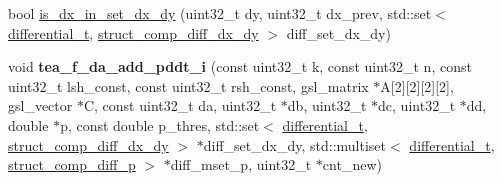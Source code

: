 \begin{DoxyCompactItemize}
bool \hyperlink{tea-f-add-pddt_8hh_a82603f2a5c7ada2fad8d82f93287ff05}{is\-\_\-dx\-\_\-in\-\_\-set\-\_\-dx\-\_\-dy} (uint32\-\_\-t dy, uint32\-\_\-t dx\-\_\-prev, std\-::set$<$ \hyperlink{structdifferential__t}{differential\-\_\-t}, \hyperlink{structstruct__comp__diff__dx__dy}{struct\-\_\-comp\-\_\-diff\-\_\-dx\-\_\-dy} $>$ diff\-\_\-set\-\_\-dx\-\_\-dy)
\item 
\hypertarget{tea-f-add-pddt_8hh_aa6c5708f75451dca26796f0e644651e6}{void {\bfseries tea\-\_\-f\-\_\-da\-\_\-add\-\_\-pddt\-\_\-i} (const uint32\-\_\-t k, const uint32\-\_\-t n, const uint32\-\_\-t lsh\-\_\-const, const uint32\-\_\-t rsh\-\_\-const, gsl\-\_\-matrix $\ast$\-A\mbox{[}2\mbox{]}\mbox{[}2\mbox{]}\mbox{[}2\mbox{]}\mbox{[}2\mbox{]}, gsl\-\_\-vector $\ast$\-C, const uint32\-\_\-t da, uint32\-\_\-t $\ast$db, uint32\-\_\-t $\ast$dc, uint32\-\_\-t $\ast$dd, double $\ast$p, const double p\-\_\-thres, std\-::set$<$ \hyperlink{structdifferential__t}{differential\-\_\-t}, \hyperlink{structstruct__comp__diff__dx__dy}{struct\-\_\-comp\-\_\-diff\-\_\-dx\-\_\-dy} $>$ $\ast$diff\-\_\-set\-\_\-dx\-\_\-dy, std\-::multiset$<$ \hyperlink{structdifferential__t}{differential\-\_\-t}, \hyperlink{structstruct__comp__diff__p}{struct\-\_\-comp\-\_\-diff\-\_\-p} $>$ $\ast$diff\-\_\-mset\-\_\-p, uint32\-\_\-t $\ast$cnt\-\_\-new)}\label{tea-f-add-pddt_8hh_aa6c5708f75451dca26796f0e644651e6}


\end{DoxyCompactItemize}
